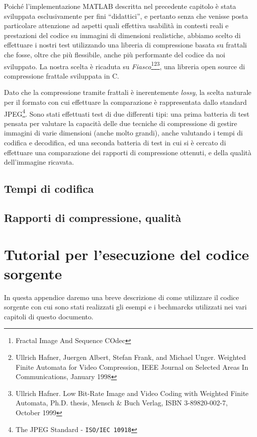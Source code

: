 \documentclass[11pt,a4paper,appendixprefix=true,numbers=noenddot]{scrreprt}
\begin{document}
Poiché l'implementazione MATLAB descritta nel precedente capitolo è stata sviluppata esclusivamente per fini ``didattici'', e pertanto senza che venisse posta particolare attenzione ad aspetti quali effettiva usabilità in contesti reali e prestazioni del codice su immagini di dimensioni realistiche, abbiamo scelto di effettuare i nostri test utilizzando una libreria di compressione basata su frattali che fosse, oltre che più flessibile, anche più performante del codice da noi sviluppato. La nostra scelta è ricaduta su \emph{Fiasco}\footnote{Fractal Image And Sequence COdec}\footnote{Ullrich Hafner, Juergen Albert, Stefan Frank, and Michael Unger.  Weighted Finite Automata for Video Compression, IEEE Journal on Selected Areas In Communications, January 1998}\footnote{Ullrich  Hafner.  Low Bit-Rate Image and Video Coding with Weighted Finite Automata, Ph.D. thesis, Mensch \& Buch Verlag, ISBN 3-89820-002-7, October 1999}, una libreria open source di compressione frattale sviluppata in C.

Dato che la compressione tramite frattali è inerentemente \emph{lossy}, la scelta naturale per il formato con cui effettuare la comparazione è rappresentata dallo standard JPEG\footnote{The JPEG Standard - \texttt{ISO/IEC 10918}}. Sono stati effettuati test di due differenti tipi: una prima batteria di test pensata per valutare la capacità delle due tecniche di compressione di gestire immagini di varie dimensioni (anche molto grandi), anche valutando i tempi di codifica e decodifica, ed una seconda batteria di test in cui si è cercato di effettuare una comparazione dei rapporti di compressione ottenuti, e della qualità dell'immagine ricavata. 

\section{ Tempi di codifica }

\section{ Rapporti di compressione, qualità }

\appendix

\chapter{Tutorial per l'esecuzione del codice sorgente}

In questa appendice daremo una breve descrizione di come utilizzare il codice sorgente con cui sono stati realizzati gli esempi e i bechmarcks utilizzati nei vari capitoli di questo documento. 
\end{document}
